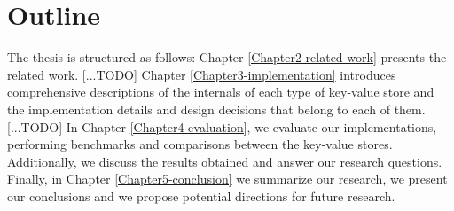 \section{Outline}

The thesis is structured as follows: Chapter \ref{Chapter2-related-work} presents the related work. [...TODO]
Chapter \ref{Chapter3-implementation} introduces comprehensive descriptions of the internals of each type of key-value store and the implementation details and design decisions that belong to each of them. [...TODO]
In Chapter \ref{Chapter4-evaluation}, we evaluate our implementations, performing benchmarks and comparisons between the key-value stores. Additionally, we discuss the results obtained and answer our research questions.
Finally, in Chapter \ref{Chapter5-conclusion} we summarize our research, we present our conclusions and we propose potential directions for future research. %
